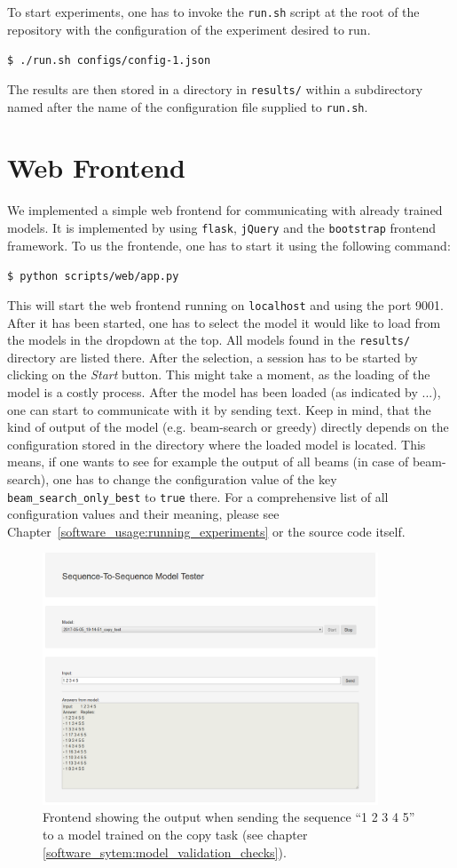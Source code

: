 To start experiments, one has to invoke the \texttt{run.sh} script at the root of the repository with the configuration of the experiment desired to run.

\texttt{\$ ./run.sh configs/config-1.json}

The results are then stored in a directory in \texttt{results/} within a subdirectory named after the name of the configuration file supplied to \texttt{run.sh}.

\section{Web Frontend}
\label{sofware_usage:web_frontend}
We implemented a simple web frontend for communicating with already trained models. It is implemented by using \texttt{flask}, \texttt{jQuery} and the \texttt{bootstrap} frontend framework. To us the frontende, one has to start  it using the following command:

\texttt{\$ python scripts/web/app.py}

This will start the web frontend running on \texttt{localhost} and using the port 9001. After it has been started, one has to select the model it would like to load from the models in the dropdown at the top. All models found in the \texttt{results/} directory are listed there. After the selection, a session has to be started by clicking on the \emph{Start} button. This might take a moment, as the loading of the model is a costly process. After the model has been loaded (as indicated by ...), one can start to communicate with it by sending text. Keep in mind, that the kind of output of the model (e.g. beam-search or greedy) directly depends on the configuration stored in the directory where the loaded model is located. This means, if one wants to see for example the output of all beams (in case of beam-search), one has to change the configuration value of the key \texttt{beam\_search\_only\_best} to \texttt{true} there. For a comprehensive list of all configuration values and their meaning, please see Chapter~\ref{software_usage:running_experiments} or the source code itself.
\\
\begin{figure}[H]
	\centering
	\includegraphics[width=10cm]{img/web_frontend_inference}
	\caption{Frontend showing the output when sending the sequence ``1 2 3 4 5'' to a model trained on the copy task (see chapter \ref{software_sytem:model_validation_checks}).}
\end{figure}